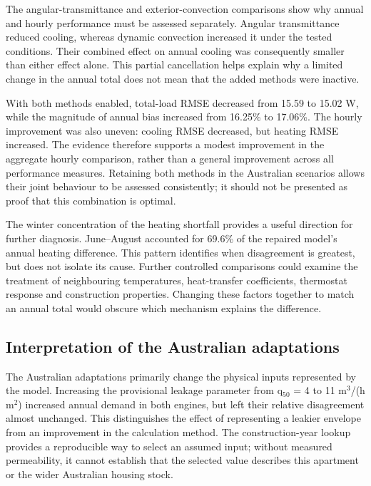 The angular-transmittance and exterior-convection comparisons show why annual and hourly performance must be assessed separately. Angular transmittance reduced cooling, whereas dynamic convection increased it under the tested conditions. Their combined effect on annual cooling was consequently smaller than either effect alone. This partial cancellation helps explain why a limited change in the annual total does not mean that the added methods were inactive.

With both methods enabled, total-load RMSE decreased from 15.59 to 15.02 W, while the magnitude of annual bias increased from 16.25\% to 17.06\%. The hourly improvement was also uneven: cooling RMSE decreased, but heating RMSE increased. The evidence therefore supports a modest improvement in the aggregate hourly comparison, rather than a general improvement across all performance measures. Retaining both methods in the Australian scenarios allows their joint behaviour to be assessed consistently; it should not be presented as proof that this combination is optimal.

The winter concentration of the heating shortfall provides a useful direction for further diagnosis. June--August accounted for 69.6\% of the repaired model's annual heating difference. This pattern identifies when disagreement is greatest, but does not isolate its cause. Further controlled comparisons could examine the treatment of neighbouring temperatures, heat-transfer coefficients, thermostat response and construction properties. Changing these factors together to match an annual total would obscure which mechanism explains the difference.

\subsection{Interpretation of the Australian adaptations}

The Australian adaptations primarily change the physical inputs represented by the model. Increasing the provisional leakage parameter from q$_{50}$ = 4 to 11 m$^3$/(h m$^2$) increased annual demand in both engines, but left their relative disagreement almost unchanged. This distinguishes the effect of representing a leakier envelope from an improvement in the calculation method. The construction-year lookup provides a reproducible way to select an assumed input; without measured permeability, it cannot establish that the selected value describes this apartment or the wider Australian housing stock.

